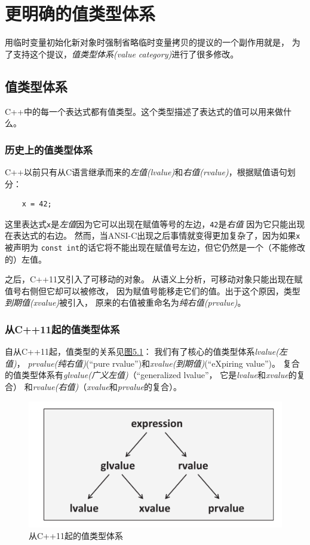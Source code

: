 \section{更明确的值类型体系}
用临时变量初始化新对象时强制省略临时变量拷贝的提议的一个副作用就是，
为了支持这个提议，\emph{值类型体系(value category)}进行了很多修改。

\subsection{值类型体系}\label{ch5.3.1}
C++中的每一个表达式都有值类型。这个类型描述了表达式的值可以用来做什么。

\subsubsection{历史上的值类型体系}\label{ch5.3.1.1}
C++以前只有从C语言继承而来的\emph{左值(lvalue)}和\emph{右值(rvalue)}，根据赋值语句划分：
\begin{lstlisting}
    x = 42;
\end{lstlisting}
这里表达式\texttt{x}是\emph{左值}因为它可以出现在赋值等号的左边，\texttt{42}是\emph{右值}
因为它只能出现在表达式的右边。
然而，当ANSI-C出现之后事情就变得更加复杂了，因为如果\texttt{x}被声明为
\texttt{const int}的话它将不能出现在赋值号左边，但它仍然是一个（不能修改的）左值。

之后，C++11又引入了可移动的对象。
从语义上分析，可移动对象只能出现在赋值号右侧但它却可以被修改，
因为赋值号能移走它们的值。出于这个原因，类型\emph{到期值(xvalue)}被引入，
原来的右值被重命名为\emph{纯右值(prvalue)}。

\subsubsection{从C++11起的值类型体系}
自从C++11起，值类型的关系见\hyperref[f5.1]{图5.1}：
我们有了核心的值类型体系\emph{lvalue(左值)}，
\emph{prvalue(纯右值)}(“pure rvalue”)和\emph{xvalue(到期值)}(“eXpiring value”)。
复合的值类型体系有\emph{glvalue(广义左值)}（“generalized lvalue”，
它是\emph{lvalue}和\emph{xvalue}的复合）
和\emph{rvalue(右值)}（\emph{xvalue}和\emph{prvalue}的复合）。

\begin{figure}[htb]
    \centering
    \includegraphics[scale=0.8]{../imgs/05.1.png}
    \caption{从C++11起的值类型体系}
    \label{f5.1}
\end{figure}

